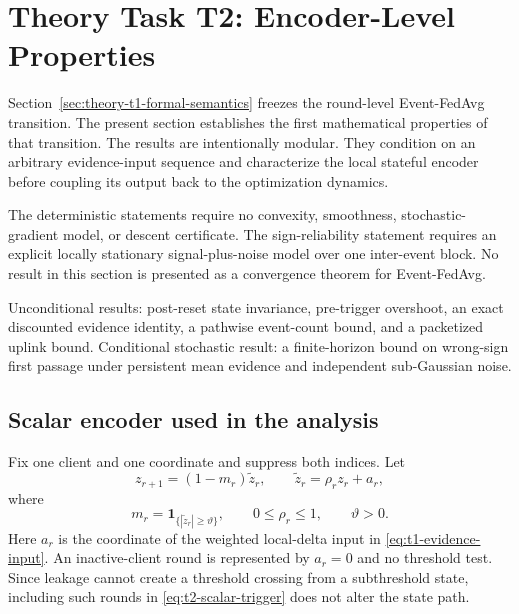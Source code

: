 \section{Theory Task T2: Encoder-Level Properties}
\label{sec:theory-t2-encoder-properties}

Section~\ref{sec:theory-t1-formal-semantics} freezes the round-level Event-FedAvg transition. The present section establishes the first mathematical properties of that transition. The results are intentionally modular. They condition on an arbitrary evidence-input sequence and characterize the local stateful encoder before coupling its output back to the optimization dynamics.

The deterministic statements require no convexity, smoothness, stochastic-gradient model, or descent certificate. The sign-reliability statement requires an explicit locally stationary signal-plus-noise model over one inter-event block. No result in this section is presented as a convergence theorem for Event-FedAvg.

\begin{takeawaybox}[title={T2 result boundary}]
Unconditional results: post-reset state invariance, pre-trigger overshoot, an exact discounted evidence identity, a pathwise event-count bound, and a packetized uplink bound. Conditional stochastic result: a finite-horizon bound on wrong-sign first passage under persistent mean evidence and independent sub-Gaussian noise.
\end{takeawaybox}

\subsection{Scalar encoder used in the analysis}

Fix one client and one coordinate and suppress both indices. Let
\begin{equation}
    z_{r+1}
    =
    (1-m_r)\widetilde z_r,
    \qquad
    \widetilde z_r=\rho_r z_r+a_r,
    \label{eq:t2-scalar-transition}
\end{equation}
where
\begin{equation}
    m_r=\mathbf{1}_{\{|\widetilde z_r|\geq\vartheta\}},
    \qquad
    0\leq\rho_r\leq1,
    \qquad
    \vartheta>0.
    \label{eq:t2-scalar-trigger}
\end{equation}
Here $a_r$ is the coordinate of the weighted local-delta input in \eqref{eq:t1-evidence-input}. An inactive-client round is represented by $a_r=0$ and no threshold test. Since leakage cannot create a threshold crossing from a subthreshold state, including such rounds in \eqref{eq:t2-scalar-trigger} does not alter the state path.

